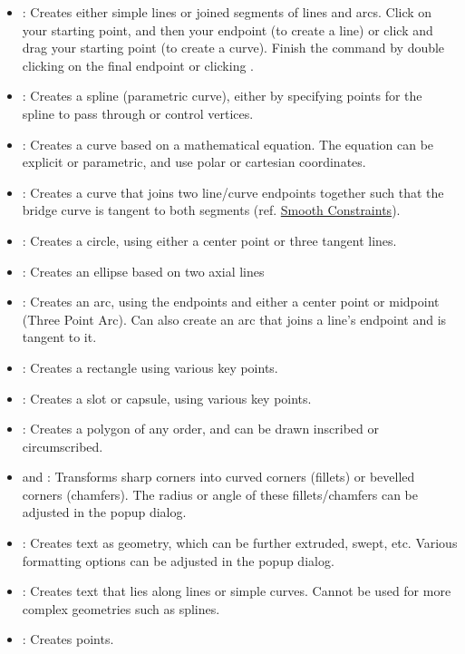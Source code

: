 \begin{itemize}
\item {}: Creates either simple lines or joined segments of lines and arcs. Click on your starting point, and then your endpoint (to create a line) or click and drag your starting point (to create a curve). Finish the command by double clicking on the final endpoint or clicking .
\item {}: Creates a spline (parametric curve), either by specifying points for the spline to pass through or control vertices. 
\item {}: Creates a curve based on a mathematical equation. The equation can be explicit or parametric, and use polar or cartesian coordinates.
\item {}: Creates a curve that joins two line/curve endpoints together such that the bridge curve is tangent to both segments (ref. \hyperref[subsection: Types of Constraints]{Smooth Constraints}).
\item {}: Creates a circle, using either a center point or three tangent lines.
\item {}: Creates an ellipse based on two axial lines
\item {}: Creates an arc, using the endpoints and either a center point or midpoint (Three Point Arc). Can also create an arc that joins a line's endpoint and is tangent to it.
\item {}: Creates a rectangle using various key points.
\item {}: Creates a slot or capsule, using various key points.
\item {}: Creates a polygon of any order, and can be drawn inscribed or circumscribed.
\item {} and : Transforms sharp corners into curved corners (fillets) or bevelled corners (chamfers). The radius or angle of these fillets/chamfers can be adjusted in the popup dialog.
\item {}: Creates text as geometry, which can be further extruded, swept, etc. Various formatting options can be adjusted in the popup dialog.
\item {}: Creates text that lies along lines or simple curves. Cannot be used for more complex geometries such as splines.
\item {}: Creates points.

\end{itemize}

